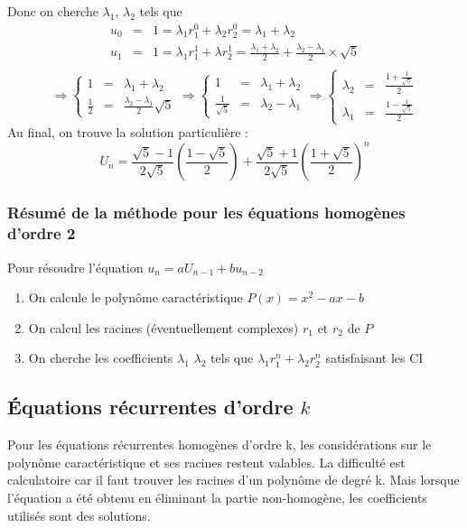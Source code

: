 	Donc on cherche $\lambda_1$, $\lambda_2$ tels que
	\begin{eqnarray*}
		u_0 &=&  1 = \lambda_1 r^0_1 + \lambda_2r_2^0 = \lambda_1 + \lambda_2\\
		u_1&=&  1 = \lambda_1 r^1_1 + \lambda r^1_2 = \frac{\lambda_1 + \lambda_2}{2} + \frac{\lambda_2 - \lambda _ 1}{2} \times \sqrt{5}\\
	\end{eqnarray*}
	\begin{displaymath}
		\Rightarrow 
		\left\{ \begin{array}{lll}
			1 &=&  \lambda_1 + \lambda_2\\
			\frac{1}{2} &=& \frac{\lambda_2 - \lambda_1}{2}\sqrt{5}
		\end{array} \right.
		\Rightarrow 
		\left\{ \begin{array}{lll}
			1 &=&  \lambda_1 + \lambda_2\\
			\frac{1}{\sqrt{5}} &=& \lambda_2 - \lambda_1
		\end{array} \right.
		\Rightarrow 
		\left\{ \begin{array}{lll}
			\lambda_2 &=&  \frac{1+\frac{1}{\sqrt{5}}}{2}\\
			\lambda_1 &=&  \frac{1-\frac{1}{\sqrt{5}}}{2}
		\end{array} \right.
	\end{displaymath}
	Au final, on trouve la solution particulière : 
	$$U_n = \frac{\sqrt{5}-1}{2\sqrt{5}}(\frac{1-\sqrt{5}}{2}) + \frac{\sqrt{5}+1}{2\sqrt{5}}(\frac{1+\sqrt{5}}{2})^n$$
	
	\subsubsection{Résumé de la méthode pour les équations homogènes d'ordre 2}
	Pour résoudre l'équation $u_n = aU_{n-1} + bu_{n-2}$
	\begin{enumerate}
		\item On calcule le polynôme caractéristique $P(x) = x^2 - ax -b$
		\item On calcul les racines (éventuellement complexes)
			$r_1$ et $r_2$ de $P$
		\item On cherche les coefficients $\lambda_1$ $\lambda_2$ tels que $\lambda_1r_1^n + \lambda_2r_2^n$ satisfaisant les CI
	\end{enumerate}

	\subsection{Équations récurrentes d'ordre $k$}
	Pour les équations récurrentes homogènes d'ordre k, les considérations sur le polynôme caractéristique et ses racines restent valables. La difficulté
	est calculatoire car il faut trouver les racines d'un polynôme de degré k. Mais lorsque l'équation a été obtenu en éliminant  la partie
	non-homogène, les coefficients utilisés sont des solutions. 


